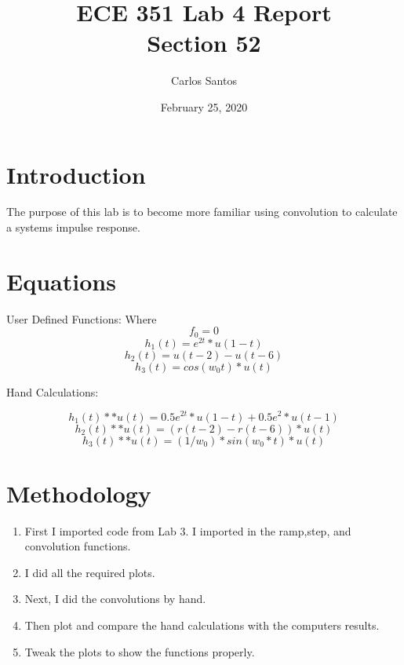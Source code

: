 \documentclass[12pt]{article}
\title{ECE 351 Lab 4 Report \\ Section 52}
\date{February 25, 2020}
\author{Carlos Santos}
\begin{document}
\vspace{\fill}
\maketitle
\vspace{\fill}
\clearpage

\section*{Introduction}

The purpose of this lab is to become more familiar using convolution to calculate a systems impulse response.

\section*{Equations}

User Defined Functions: Where \[ f_{0} = 0 \]
\begin{equation}
    h_1(t) = e^{2t}*u(1-t)
\end{equation}{}
\begin{equation}
    h_2(t) = u(t-2) - u(t-6)
\end{equation}
\begin{equation}
    h_3(t) = cos(w_0t)*u(t)
\end{equation}

Hand Calculations:

\begin{equation}
    h_1(t)**u(t) = 0.5e^{2t}*u(1-t) + 0.5e^{2}*u(t-1) 
\end{equation}
\begin{equation}
    h_2(t)**u(t) = (r(t-2) - r(t-6))*u(t)
\end{equation}
\begin{equation}
    h_3(t)**u(t) = (1/w_0) * sin(w_0*t)*u(t)
\end{equation}


\section*{Methodology}

\begin{enumerate}
    \item First I imported code from Lab 3. I imported in the ramp,step, and convolution functions.
    \item I did all the required plots.
    \item Next, I did the convolutions by hand. 
    \item Then plot and compare the hand calculations with the computers results.
    \item Tweak the plots to show the functions properly.
\end{enumerate}
\end{document}
